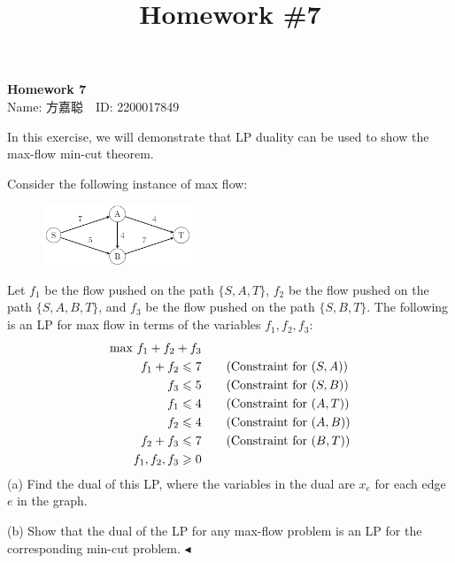 \documentclass[11pt]{article}
\title{Homework \#7}
\newenvironment{problem}[2][Problem]{\begin{trivlist}
    \item[\hskip \labelsep{\bfseries#1}\hskip\labelsep{\bfseries#2.}]\mbox{}\newline}{\hfill$\blacktriangleleft$\end{trivlist}}
\begin{document}
\kaishu

\pagestyle{fancy}
\chead{}

\begin{center}
    {\LARGE \bf Homework 7}\\
    {Name: 方嘉聪\ \  ID: 2200017849}            %
\end{center}

\begin{problem}{1. (Max Flow, Min Cut, and Duality)}
    In this exercise, we will demonstrate that LP duality can be used to show the max-flow min-cut theorem.

Consider the following instance of max flow:
\begin{figure}[h]
    \centering
    \includegraphics[width=0.4\textwidth]{figs/netflow1.png}
\end{figure}

Let $f_1$ be the flow pushed on the path $\{S,A,T\}$, $f_2$ be the flow pushed on the path $\{S,A,B,T\}$, and $f_3$ be the flow pushed on the path $\{S,B,T\}$. The following is an LP for max flow in terms of the variables $f_1, f_2, f_3$:
\begin{align*}
    \text{max } f_1+f_2+f_3 &\\
    f_1 + f_2 \leqslant 7 &  \text{\qquad (Constraint for $(S,A)$)}\\
    f_3 \leqslant 5 &   \text{\qquad (Constraint for $(S,B)$)}\\
    f_1 \leqslant 4 &   \text{\qquad (Constraint for $(A,T)$)}\\
    f_2 \leqslant 4 &   \text{\qquad (Constraint for $(A,B)$)}\\
    f_2 + f_3 \leqslant 7&  \text{\qquad (Constraint for $(B,T)$)}\\
    f_1, f_2, f_3 \geqslant 0&
\end{align*}
(a) Find the dual of this LP, where the variables in the dual are $x_e$ for each edge $e$ in the graph.

(b) Show that the dual of the LP for any max-flow problem is an LP for the corresponding min-cut problem.
\end{problem}
\end{document}
